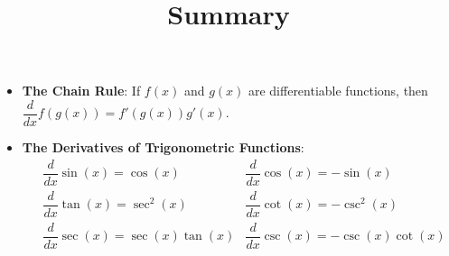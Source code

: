 \documentclass{ximera}
\title[Summary]{Summary}
\begin{document}
\begin{abstract} \end{abstract}
\maketitle


\begin{itemize}
	\item \textbf{The Chain Rule}: If $f(x)$ and $g(x)$ are differentiable functions, then $\displaystyle \dfrac{d}{dx} f\left(g(x)\right) = f'\left( g(x)\right) g'(x)$.
		
	\item \textbf{The Derivatives of Trigonometric Functions}:
		\begin{align*}
			&\dfrac{d}{dx}\sin(x) = \cos(x)  \quad & \dfrac{d}{dx} \cos(x) = -\sin(x) \\
			&\dfrac{d}{dx}\tan(x) = \sec^2(x)  &\dfrac{d}{dx} \cot(x) = -\csc^2(x) \\
			&\dfrac{d}{dx}\sec(x) = \sec(x)\tan(x)  &\dfrac{d}{dx} \csc(x) = -\csc(x)\cot(x)
		\end{align*}
\end{itemize}
\end{document}
